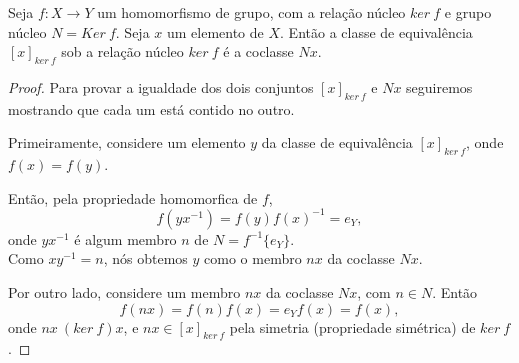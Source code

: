          \begin{stat}
            Seja $f: X\to Y$ um homomorfismo de grupo, com a relação núcleo $ker\ f$ e grupo núcleo $N=Ker\ f$. Seja $x$ um elemento de $X$. Então a classe de equivalência $[x]_{ker\ f}$ sob a relação núcleo $ker\ f$ é a coclasse $Nx$.
            \begin{proof}
               Para provar a igualdade dos dois conjuntos $[x]_{ker\ f}$ e $Nx$ seguiremos mostrando que cada um está contido no outro.

               Primeiramente, considere um elemento $y$ da classe de equivalência $[x]_{ker\ f}$, onde $f(x) = f(y)$.

               Então, pela propriedade homomorfica de $f$, $$f(yx^{-1}) = f(y)f(x)^{-1} = e_{Y},$$ onde $yx^{-1}$ é algum membro $n$ de $N=f^{-1}\{e_{Y}\}$.\\
               Como $xy^{-1} = n$, nós obtemos $y$ como o membro $nx$ da coclasse $Nx$.

               Por outro lado, considere um membro $nx$ da coclasse $Nx$, com $n \in N$. Então $$f(nx)=f(n)f(x)=e_{Y}f(x)=f(x),$$ 
               onde $nx\ (ker\ f) x$, e $nx \in [x]_{ker\ f}$ pela simetria (propriedade simétrica) de $ker\ f$.
            \end{proof}
         \end{stat}


